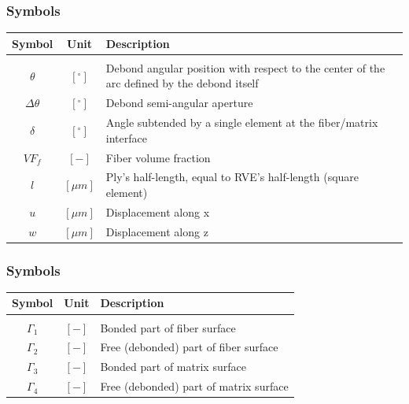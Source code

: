 \documentclass[first,firstsupp,lastsupp,handout,last,hyperref,table]{ETHclass}
\begin{document}
\begin{frame}
\frametitle{Symbols}
\vspace{-0.25cm}
\footnotesize
\centering
\captionsetup[figure]{font=scriptsize,labelfont=scriptsize}
\begin{table}[htbp]

  \centering
    \begin{tabularx}{\textwidth}{ccX}
    \textbf{Symbol}&\textbf{Unit} & \textbf{Description} \\[3pt]
    \midrule\\[12pt]
	$\theta$ & $\left[^{\circ}\right]$ & Debond angular position with respect to the center of the arc defined by the debond itself\\[1.5pt]
	$\Delta\theta$ & $\left[^{\circ}\right]$ & Debond semi-angular aperture\\[4pt]
	$\delta$ & $\left[^{\circ}\right]$ & Angle subtended by a single element at the fiber/matrix interface\\[3pt]
	$VF_{f}$ & $\left[-\right]$ & Fiber volume fraction\\[1.5pt]
	$l$ & $\left[\mu m\right]$ & Ply's half-length, equal to RVE's half-length (square element)\\[3pt]
	$u$ & $\left[\mu m\right]$ & Displacement along x\\[1.5pt]
	$w$ & $\left[\mu m\right]$ & Displacement along z\\
    \end{tabularx}%
  \label{tab:phaseprop}%
\end{table}%
\end{frame}

\begin{frame}
\frametitle{Symbols}
\vspace{-0.25cm}
\footnotesize
\centering
\captionsetup[figure]{font=scriptsize,labelfont=scriptsize}
\begin{table}[htbp]

  \centering
    \begin{tabularx}{\textwidth}{ccX}
    \textbf{Symbol}&\textbf{Unit} & \textbf{Description} \\[3pt]
    \midrule\\[12pt]
	$\Gamma_{1}$ & $\left[-\right]$ & Bonded part of fiber surface\\[1.5pt]
	$\Gamma_{2}$ & $\left[-\right]$ & Free (debonded) part of fiber surface\\[1.5pt]
	$\Gamma_{3}$ & $\left[-\right]$ & Bonded part of matrix surface\\[1.5pt]
	$\Gamma_{4}$ & $\left[-\right]$ & Free (debonded) part of matrix surface\\[1.5pt]
    \end{tabularx}%
  \label{tab:phaseprop}%
\end{table}%
\end{frame}
\end{document}
